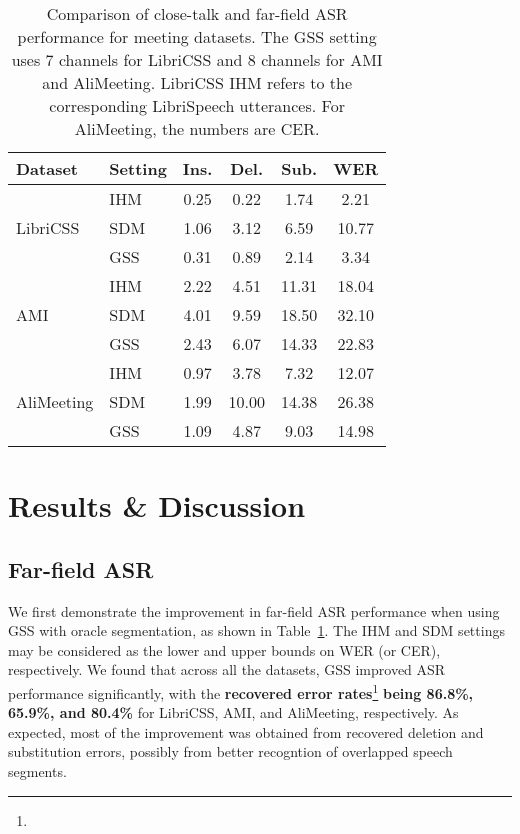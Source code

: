 \documentclass[a4paper]{article}
\begin{document}
\begin{table}[t]
\centering
\caption{Comparison of close-talk and far-field ASR performance for meeting datasets. The GSS setting uses 7 channels for LibriCSS and 8 channels for AMI and AliMeeting. LibriCSS IHM refers to the corresponding LibriSpeech utterances. For AliMeeting, the numbers are CER.}
\label{tab:asr}
\begin{tabular}{@{}llcccc@{}}
\toprule
\textbf{Dataset} & \textbf{Setting} & \textbf{Ins.} & \textbf{Del.} & \textbf{Sub.} & \textbf{WER} \\ \midrule
\multirow{3}{*}{LibriCSS} & IHM & 0.25 & 0.22 & 1.74 & 2.21 \\
 & SDM & 1.06 & 3.12 & 6.59 & 10.77 \\
 & GSS & 0.31 & 0.89 & 2.14 & 3.34 \\
\hline \hline
\multirow{3}{*}{AMI} & IHM & 2.22 & 4.51 & 11.31 & 18.04 \\
 & SDM & 4.01 & 9.59 & 18.50 & 32.10 \\
 & GSS & 2.43 & 6.07 & 14.33 & 22.83 \\
\hline \hline
\multirow{3}{*}{AliMeeting} & IHM & 0.97 & 3.78 & 7.32 & 12.07 \\
 & SDM & 1.99 & 10.00 & 14.38 & 26.38 \\
 & GSS & 1.09 & 4.87 & 9.03 & 14.98 \\ 
\bottomrule
\end{tabular}
\end{table}




\section{Results \& Discussion}

\subsection{Far-field ASR}
\label{sec:asr}

We first demonstrate the improvement in far-field ASR performance when using GSS with oracle segmentation, as shown in Table~\ref{tab:asr}. The IHM and SDM settings may be considered as the lower and upper bounds on WER (or CER), respectively. We found that across all the datasets, GSS improved ASR performance significantly, with the \textbf{recovered error rates}\footnote{} \textbf{being 86.8\%, 65.9\%, and 80.4\%} for LibriCSS, AMI, and AliMeeting, respectively. As expected, most of the improvement was obtained from recovered deletion and substitution errors, possibly from better recogntion of overlapped speech segments.
\end{document}
